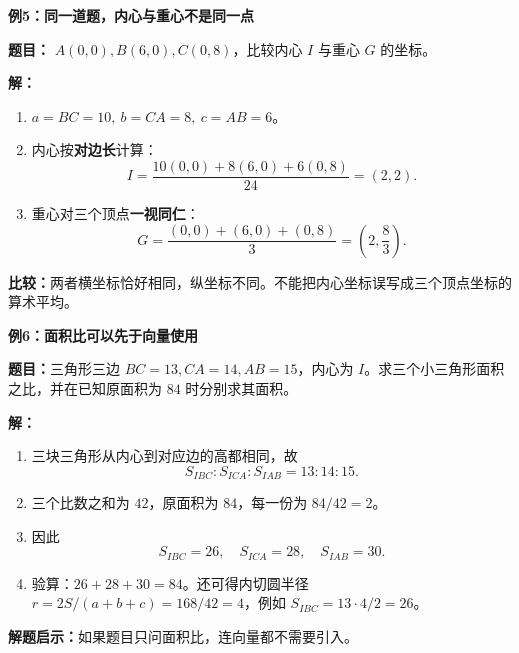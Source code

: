 \begin{examplebox}
\par\noindent\begin{minipage}{\linewidth}
\textbf{例5：同一道题，内心与重心不是同一点}

\textbf{题目：} $A(0,0), B(6,0), C(0,8)$，比较内心 $I$ 与重心 $G$ 的坐标。

\end{minipage}\par
\textbf{解：}
\begin{enumerate}
\item $a=BC=10,\ b=CA=8,\ c=AB=6$。
\item 内心按\textbf{对边长}计算：
\[
I=\frac{10(0,0)+8(6,0)+6(0,8)}{24}=(2,2).
\]
\item 重心对三个顶点\textbf{一视同仁}：
\[
G=\frac{(0,0)+(6,0)+(0,8)}{3}=\left(2,\frac83\right).
\]
\end{enumerate}
\textbf{比较：}两者横坐标恰好相同，纵坐标不同。不能把内心坐标误写成三个顶点坐标的算术平均。
\end{examplebox}

\begin{examplebox}
\par\noindent\begin{minipage}{\linewidth}
\textbf{例6：面积比可以先于向量使用}

\textbf{题目：}三角形三边 $BC=13,CA=14,AB=15$，内心为 $I$。求三个小三角形面积之比，并在已知原面积为 $84$ 时分别求其面积。

\end{minipage}\par
\textbf{解：}
\begin{enumerate}
\item 三块三角形从内心到对应边的高都相同，故
\[
S_{IBC}:S_{ICA}:S_{IAB}=13:14:15.
\]
\item 三个比数之和为 $42$，原面积为 $84$，每一份为 $84/42=2$。
\item 因此
\[
\boxed{S_{IBC}=26,\quad S_{ICA}=28,\quad S_{IAB}=30.}
\]
\item 验算：$26+28+30=84$。还可得内切圆半径 $r=2S/(a+b+c)=168/42=4$，例如 $S_{IBC}=13\cdot4/2=26$。
\end{enumerate}
\textbf{解题启示：}如果题目只问面积比，连向量都不需要引入。
\end{examplebox}
